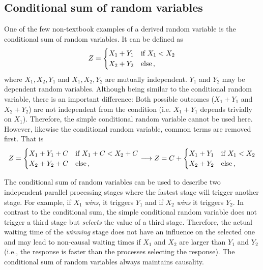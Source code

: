\subsection{Conditional sum of random variables}
One of the few non-textbook examples of a derived random variable is the conditional sum of random variables. 
It can be defined as
\begin{equation}
 Z = \begin{cases}
   X_1 + Y_1 & \mbox{if } X_1 < X_2\\
   X_2 + Y_2 & \mbox{else\,,} 
 \end{cases} \nonumber
\end{equation}
where $X_1, X_2, Y_1$ and $X_1, X_2, Y_2$ are mutually independent. $Y_1$ and $Y_2$ may be 
dependent random variables. Although being similar to the conditional random variable, there is an 
important difference: Both possible outcomes ($X_1+Y_1$ and $X_2+Y_2$) 
are not independent from the condition (i.e. $X_1+Y_1$ depends trivially on $X_1$).
Therefore, the simple conditional random variable cannot be used here. However, likewise the
conditional random variable, common terms are removed first. That is
\begin{equation}
 Z = \begin{cases}
   X_1 + Y_1 + C& \mbox{if } X_1 + C < X_2 + C\\
   X_2 + Y_2 + C& \mbox{else\,,} 
 \end{cases} \longrightarrow 
 Z = C + \begin{cases}
   X_1 + Y_1 & \mbox{if } X_1 < X_2\\
   X_2 + Y_2 & \mbox{else\,,} 
 \end{cases} \nonumber
\end{equation}


The conditional sum of random variables can be used to describe two independent parallel processing
stages where the fastest stage will trigger another stage. For example, if $X_1$ \emph{wins}, it triggers $Y_1$
and if $X_2$ \emph{wins} it triggers $Y_2$. In contrast to the conditional sum, the 
simple conditional random variable does not trigger a third stage but \emph{selects} the value of a third stage. 
Therefore, the actual waiting time of the \emph{winning} stage does not have an influence on the 
selected one and may lead to non-causal waiting times if $X_1$ and $X_2$ are larger than $Y_1$ and
$Y_2$ (i.e., the response is faster than the processes selecting the response). The conditional sum
of random variables always maintains causality.  	

